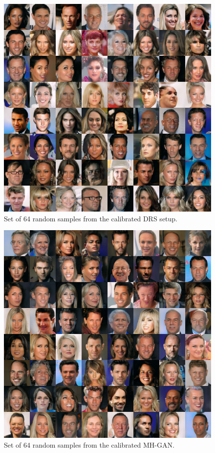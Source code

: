 \documentclass{article}
\newcommand{\exfactor}{1.0}
\begin{document}
\begin{figure}[htbp]
    \centering
    \includegraphics[width=\exfactor\textwidth]{figures/pgan/all_base_iso_reject.jpg}
    \caption{
    Set of 64 random samples from the calibrated DRS setup.
    }
    \label{fig:DRS 64x}
\end{figure}

\begin{figure}[htbp]
    \centering
    \includegraphics[width=\exfactor\textwidth]{figures/pgan/all_base_iso_MH.jpg}
    \caption{
    Set of 64 random samples from the calibrated MH-GAN\@.
    }
    \label{fig:MHGAN 64x}
\end{figure}



\end{document}
